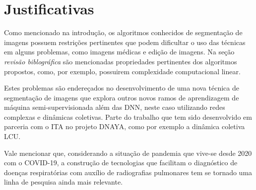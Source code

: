 \chapter{Justificativas}\label{cap:justificativas}

Como mencionado na introdução, os algoritmos conhecidos de segmentação
de imagens possuem restrições pertinentes que podem dificultar o uso
das técnicas em alguns problemas, como imagens médicas e edição de
imagens. Na seção \textit{revisão biblográfica} são mencionadas propriedades
pertinentes dos algoritmos propostos, como, por exemplo, possuirem complexidade
computacional linear.

Estes problemas são endereçados no desenvolvimento de uma nova técnica
de segmentação de imagens que explora outros novos ramos de
aprendizagem de máquina semi-supervisionada além das \gls{DNN}, neste
caso utilizando redes complexas e dinâmicas coletivas. Parte do
trabalho que tem sido desenvolvido em parceria com o \gls{ITA} no
projeto DNAYA\cite{DnayaMotivation}, como por exemplo a dinâmica coletiva \gls{LCU}.

Vale mencionar que, considerando a situação de pandemia que vive-se
desde 2020 com o COVID-19, a construção de tecnologias que facilitam o
diagnóstico de doenças respiratórias com auxílio de radiografias
pulmonares tem se tornado uma linha de pesquisa ainda mais relevante.
